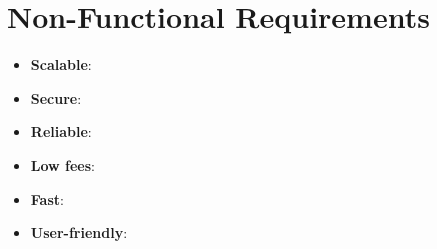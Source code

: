 \section{Non-Functional Requirements}
\label{sec:non_functional_requirements}

\begin{itemize}
    \item \textbf{Scalable}:
    \item \textbf{Secure}:
    \item \textbf{Reliable}:
    \item \textbf{Low fees}:
    \item \textbf{Fast}:
    \item \textbf{User-friendly}:
\end{itemize}
